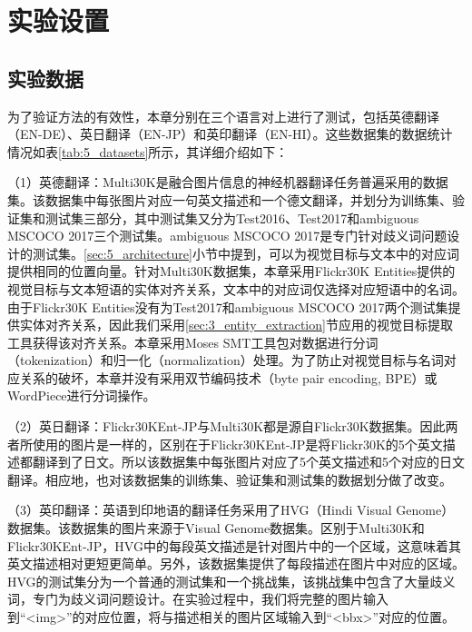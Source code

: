 \section{实验设置}
\label{sec:5_setup}

\subsection{实验数据}
\label{sec:5_datasets}

为了验证方法的有效性，本章分别在三个语言对上进行了测试，包括英德翻译（EN-DE）、英日翻译（EN-JP）和英印翻译（EN-HI）。这些数据集的数据统计情况如表\ref{tab:5_datasets}所示，其详细介绍如下：

（1）{\sffamily 英德翻译：}Multi30K是融合图片信息的神经机器翻译任务普遍采用的数据集。该数据集中每张图片对应一句英文描述和一个德文翻译，并划分为训练集、验证集和测试集三部分，其中测试集又分为Test2016、Test2017和ambiguous MSCOCO 2017三个测试集。ambiguous MSCOCO 2017是专门针对歧义词问题设计的测试集。\ref{sec:5_architecture}小节中提到，可以为视觉目标与文本中的对应词提供相同的位置向量。针对Multi30K数据集，本章采用Flickr30K Entities提供的视觉目标与文本短语的实体对齐关系，文本中的对应词仅选择对应短语中的名词。由于Flickr30K Entities没有为Test2017和ambiguous MSCOCO 2017两个测试集提供实体对齐关系，因此我们采用\ref{sec:3_entity_extraction}节应用的视觉目标提取工具获得该对齐关系。本章采用Moses SMT\cite{44_koehn-etal-2007-moses}工具包对数据进行分词（tokenization）和归一化（normalization）处理。为了防止对视觉目标与名词对应关系的破坏，本章并没有采用双节编码技术\cite{27_sennrich-etal-2016-neural}（byte pair encoding, BPE）或WordPiece\cite{28_DBLP:journals/corr/WuSCLNMKCGMKSJL16}进行分词操作。

（2）{\sffamily 英日翻译：}Flickr30KEnt-JP与Multi30K都是源自Flickr30K数据集。因此两者所使用的图片是一样的，区别在于Flickr30KEnt-JP是将Flickr30K的5个英文描述都翻译到了日文。所以该数据集中每张图片对应了5个英文描述和5个对应的日文翻译。相应地，也对该数据集的训练集、验证集和测试集的数据划分做了改变。

（3）{\sffamily 英印翻译：}英语到印地语的翻译任务采用了HVG（Hindi Visual Genome）数据集。该数据集的图片来源于Visual Genome数据集。区别于Multi30K和Flickr30KEnt-JP，HVG中的每段英文描述是针对图片中的一个区域，这意味着其英文描述相对更短更简单。另外，该数据集提供了每段描述在图片中对应的区域。HVG的测试集分为一个普通的测试集和一个挑战集，该挑战集中包含了大量歧义词，专门为歧义词问题设计。在实验过程中，我们将完整的图片输入到“<img>”的对应位置，将与描述相关的图片区域输入到“<bbx>”对应的位置。

